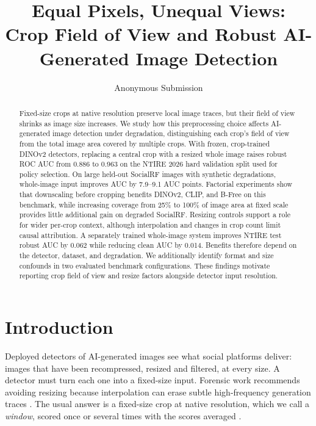 \documentclass[letterpaper]{article} %
\title{Equal Pixels, Unequal Views:\\Crop Field of View and Robust AI-Generated Image Detection}
\author{Anonymous Submission}
\begin{document}
\maketitle

\begin{abstract}
Fixed-size crops at native resolution preserve local image traces, but their
field of view shrinks as image size increases. We study how this
preprocessing choice affects AI-generated image detection under degradation,
distinguishing each crop's field of view from the total image area covered
by multiple crops. With frozen, crop-trained DINOv2 detectors, replacing a
central crop with a resized whole image raises robust ROC AUC from 0.886 to
0.963 on the NTIRE 2026 hard validation split used for policy selection. On
large held-out SocialRF images with synthetic degradations, whole-image
input improves AUC by 7.9--9.1 AUC points. Factorial experiments show
that downscaling before cropping benefits DINOv2, CLIP, and B-Free on this
benchmark, while increasing coverage from 25\% to 100\% of image area at fixed scale provides little additional gain on degraded SocialRF. Resizing controls support a role for wider per-crop context,
although interpolation and changes in crop count limit causal attribution.
A separately trained whole-image system improves NTIRE test robust AUC by
0.062 while reducing clean AUC by 0.014. Benefits therefore depend on the
detector, dataset, and degradation. We additionally identify format and size
confounds in two evaluated benchmark configurations. These findings motivate
reporting crop field of view and resize factors alongside detector input
resolution.
\end{abstract}

\section{Introduction}
\label{sec:intro}

Deployed detectors of AI-generated images see what social platforms deliver:
images that have been recompressed, resized and filtered, at every size. A
detector must turn each one into a fixed-size input. Forensic work recommends avoiding resizing because interpolation can erase subtle high-frequency generation traces
\cite{corvi2023detection}. The usual answer is a fixed-size crop at native
resolution, which we call a \emph{window}, scored once or several times with
the scores averaged
\cite{corvi2023detection,li2025safe,guillaro2025bfree,konstantinidou2025texturecrop}.
\end{document}

